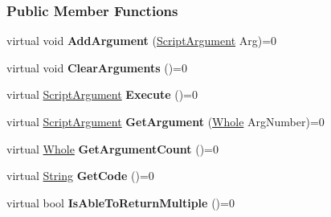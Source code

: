 \subsubsection*{Public Member Functions}
\begin{DoxyCompactItemize}
\item 
\hypertarget{classMezzanine_1_1Scripting_1_1Script_acd338ce067b4067e0b6ab25863c311c5}{
virtual void {\bfseries AddArgument} (\hyperlink{classMezzanine_1_1Scripting_1_1ScriptArgument}{ScriptArgument} Arg)=0}
\label{classMezzanine_1_1Scripting_1_1Script_acd338ce067b4067e0b6ab25863c311c5}

\item 
\hypertarget{classMezzanine_1_1Scripting_1_1Script_a504d19bd50b8d9c5b23e85c5e3131a96}{
virtual void {\bfseries ClearArguments} ()=0}
\label{classMezzanine_1_1Scripting_1_1Script_a504d19bd50b8d9c5b23e85c5e3131a96}

\item 
\hypertarget{classMezzanine_1_1Scripting_1_1Script_a611bea1d248a05f53e7a8bb34d9b4605}{
virtual \hyperlink{classMezzanine_1_1Scripting_1_1ScriptArgument}{ScriptArgument} {\bfseries Execute} ()=0}
\label{classMezzanine_1_1Scripting_1_1Script_a611bea1d248a05f53e7a8bb34d9b4605}

\item 
\hypertarget{classMezzanine_1_1Scripting_1_1Script_a5430794985b89cd9e28fbbd538a97a33}{
virtual \hyperlink{classMezzanine_1_1Scripting_1_1ScriptArgument}{ScriptArgument} {\bfseries GetArgument} (\hyperlink{namespaceMezzanine_adcbb6ce6d1eb4379d109e51171e2e493}{Whole} ArgNumber)=0}
\label{classMezzanine_1_1Scripting_1_1Script_a5430794985b89cd9e28fbbd538a97a33}

\item 
\hypertarget{classMezzanine_1_1Scripting_1_1Script_a20f82daec225f6090ac118272a92c968}{
virtual \hyperlink{namespaceMezzanine_adcbb6ce6d1eb4379d109e51171e2e493}{Whole} {\bfseries GetArgumentCount} ()=0}
\label{classMezzanine_1_1Scripting_1_1Script_a20f82daec225f6090ac118272a92c968}

\item 
\hypertarget{classMezzanine_1_1Scripting_1_1Script_ae0f1bb7cd4f537b19fcd862c977ee8e3}{
virtual \hyperlink{namespaceMezzanine_acf9fcc130e6ebf08e3d8491aebcf1c86}{String} {\bfseries GetCode} ()=0}
\label{classMezzanine_1_1Scripting_1_1Script_ae0f1bb7cd4f537b19fcd862c977ee8e3}

\item 
\hypertarget{classMezzanine_1_1Scripting_1_1Script_af52caa05f853b4fe6daf4a8d49fc182a}{
virtual bool {\bfseries IsAbleToReturnMultiple} ()=0}
\label{classMezzanine_1_1Scripting_1_1Script_af52caa05f853b4fe6daf4a8d49fc182a}


\end{DoxyCompactItemize}
